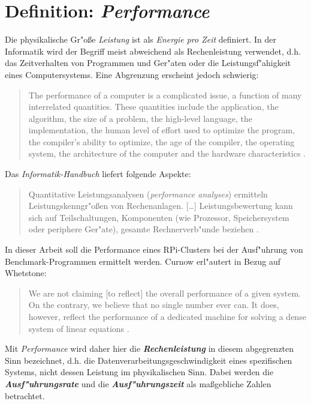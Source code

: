 \section{Definition: \textit{Performance}}\label{Performance}

Die physikalische Gr"o\ss e \textit{Leistung} ist als \textit{Energie pro Zeit} definiert. In der Informatik wird der Begriff meist abweichend als Rechenleistung verwendet, d.h. das Zeitverhalten von Programmen und Ger"aten oder die Leistungsf"ahigkeit eines Computersystems. Eine Abgrenzung erscheint jedoch schwierig: 
\begin{quote}
\onehalfspacing
The performance of a computer is a complicated issue, a function of many interrelated quantities. These quantities include the application, the algorithm, the size of a problem, the high-level language, the implementation, the human level of effort used to optimize the program, the compiler's ability to optimize, the age of the compiler, the operating system, the architecture of the computer and the hardware characteristics \cite{don03}.
\end{quote}
Das \textit{Informatik-Handbuch} liefert folgende Aspekte:
\begin{quote} 
\onehalfspacing
Quantitative Leistungsanalysen (\textit{performance analyses}) ermitteln Leistungskenngr"o\ss en von Rechenanlagen. [\dots] Leistungsbewertung kann sich auf Teilschaltungen, Komponenten (wie Prozessor, Speichersystem oder periphere Ger"ate), gesamte Rechnerverb"unde beziehen \cite{rec06}.
\end{quote}
In dieser Arbeit soll die Performance eines RPi-Clusters bei der Ausf"uhrung von Benchmark-Programmen ermittelt werden. Curnow erl"autert in Bezug auf Whetstone: 
\begin{quote}
\onehalfspacing
We are not claiming [to reflect] the overall performance of a given system. On the contrary, we believe that no single number ever can. It does, however, reflect the performance of a dedicated machine for solving a dense system of linear equations \cite{cur76}.
\end{quote}
Mit \textit{Performance} wird daher hier die \textbf{\textit{Rechenleistung}} in diesem abgegrenzten Sinn bezeichnet, d.h. die Datenverarbeitungsgeschwindigkeit eines spezifischen Systems, nicht dessen Leistung im physikalischen Sinn. Dabei werden die \textbf{\textit{Ausf"uhrungsrate}} und die \textbf{\textit{Ausf"uhrungszeit}} als ma\ss gebliche Zahlen betrachtet. 

